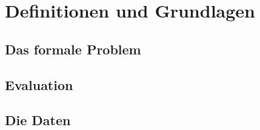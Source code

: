 %
%
%
%


\pagebreak

\section{Definitionen und Grundlagen}\raggedbottom
\subsection{Das formale Problem}
\subsection{Evaluation}
\subsection{Die Daten}

